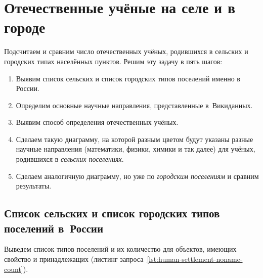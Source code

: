 \newpage

\section{Отечественные учёные на селе и в городе}

Подсчитаем и сравним число отечественных учёных, родившихся в сельских и городских типах населённых пунктов. 
Решим эту задачу в пять шагов:
\begin{enumerate}
  \item Выявим список сельских и список городских типов поселений именно в России.
  \item Определим основные научные направления, представленные в~Викиданных.
  \item Выявим способ определения отечественных учёных.
  \item Сделаем такую диаграмму, на которой разным цветом будут указаны разные научные направления (математики, физики, химики и так далее) для учёных, родившихся в \emph{сельских поселениях}.
  \item Сделаем аналогичную диаграмму, но уже по \emph{городским поселениям} и сравним результаты.
\end{enumerate}


\subsection{Список сельских и список городских типов поселений в~России}

Выведем список типов поселений и их количество для объектов, 
имеющих свойство  
и принадлежащих  (листинг запроса~\ref{lst:human-settlement-noname-count}). 

